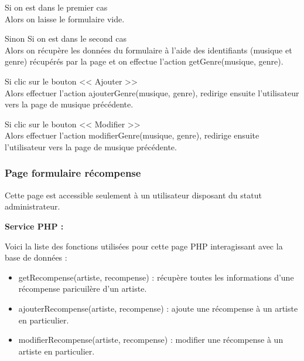 
			\begin{paragraphe}
				Si on est dans le premier cas \\
				Alors on laisse le formulaire vide.
			\end{paragraphe}

			\begin{paragraphe}
				Sinon Si on est dans le second cas \\
				Alors on récupère les données du formulaire à l'aide des identifiants (musique et genre) récupérés par la page et on effectue l'action getGenre(musique, genre).
			\end{paragraphe}

			\begin{paragraphe}
				Si clic sur le bouton << Ajouter >> \\
				Alors effectuer l'action ajouterGenre(musique, genre), redirige ensuite l'utilisateur vers la page de musique précédente.
			\end{paragraphe}

			\begin{paragraphe}
				Si clic sur le bouton << Modifier >> \\
				Alors effectuer l'action modifierGenre(musique, genre), redirige ensuite l'utilisateur vers la page de musique précédente.
			\end{paragraphe}

	\clearpage

		\subsubsection{Page formulaire récompense}

			\begin{paragraphe}
				Cette page est accessible seulement à un utilisateur disposant du statut administrateur.
			\end{paragraphe}

			\begin{paragraphe}
				\textbf{Service PHP :}
			\end{paragraphe}

			\begin{paragraphe}
				Voici la liste des fonctions utilisées pour cette page PHP interagissant avec la base de données :
				\begin{itemize}
					\item getRecompense(artiste, recompense) : récupère toutes les informations d'une récompense paricuilère d'un artiste.
					\item ajouterRecompense(artiste, recompense) : ajoute une récompense à un artiste en particulier.
					\item modifierRecompense(artiste, recompense) : modifier une récompense à un artiste en particulier.
				\end{itemize}
			\end{paragraphe}

